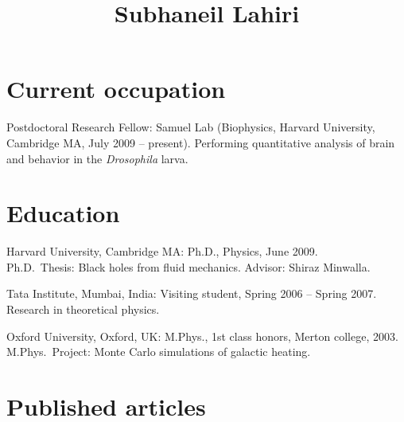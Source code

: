 \documentclass[letterpaper,10pt,notopicbreak,titleabove,plain]{simplecv}
\title{Subhaneil Lahiri}
\begin{document}
\pagestyle{empty}
\maketitle


\section{Current occupation}
\begin{topic}
\item[Postdoctoral Research Fellow:] Samuel Lab (Biophysics, Harvard University, Cambridge MA, July 2009 -- present). Performing quantitative analysis of brain and behavior in the \emph{Drosophila} larva.
\end{topic}

\section{Education}
\begin{topic}
  \item[Harvard University, Cambridge MA:] Ph.D., Physics, June 2009. \\
  Ph.D.\ Thesis: Black holes from fluid mechanics. Advisor: Shiraz Minwalla.%

  \item[Tata Institute, Mumbai, India:] Visiting student, Spring 2006 -- Spring 2007. Research in theoretical physics.

  \item[Oxford University, Oxford, UK:] M.Phys., 1st class honors, Merton college, 2003. \\
  M.Phys.\ Project: Monte Carlo simulations of galactic heating. %

\end{topic}

\section{Published articles}
\nocite{Lahiri2011,Bhattacharya:2009gm,Bhattacharyya:2007vs,Lahiri:2007ae,Biswas:2006tj}


\end{document}
